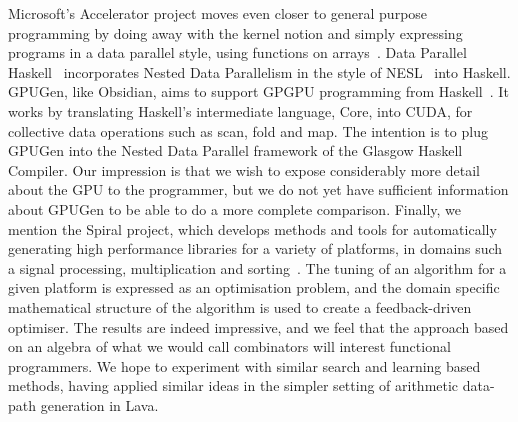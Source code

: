 Microsoft's Accelerator project moves even closer to general purpose programming by doing away with the kernel notion and simply expressing programs in a data parallel style, using functions on arrays~\cite{Accelerator}.
Data Parallel Haskell~\cite{DPH} incorporates Nested Data Parallelism in the style of NESL~\cite{NESL} into Haskell. GPUGen, like Obsidian, aims
to support GPGPU programming from Haskell~\cite{GPUGen}. It works by translating Haskell's intermediate language, Core, into CUDA, for collective data operations such as scan, fold and map. The intention is to plug GPUGen into the Nested Data Parallel framework of the Glasgow Haskell Compiler. Our impression is that we wish to expose considerably more detail about the GPU to the programmer, but we do not yet have sufficient information about GPUGen to be able to do a more complete comparison. Finally, we mention the Spiral project, which develops methods and tools for automatically generating high performance libraries for a variety of platforms, in domains such a signal processing, multiplication and sorting~\cite{Spiral}.
The tuning of an algorithm for a given platform is expressed as an optimisation problem, and the domain specific mathematical structure of the algorithm is used
to create a feedback-driven optimiser. The results are indeed impressive, and we feel that the approach based on an algebra of what we would call combinators
will interest functional programmers. We hope to experiment with similar
search and learning based methods, having applied similar ideas in the simpler setting of arithmetic data-path generation in Lava.

